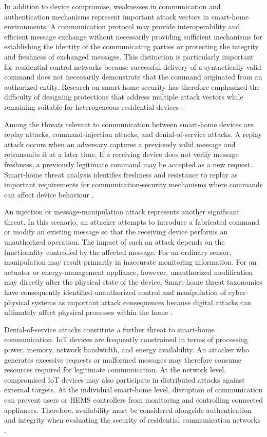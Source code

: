 In addition to device compromise, weaknesses in communication and authentication mechanisms represent important attack vectors in smart-home environments. A communication protocol may provide interoperability and efficient message exchange without necessarily providing sufficient mechanisms for establishing the identity of the communicating parties or protecting the integrity and freshness of exchanged messages. This distinction is particularly important for residential control networks because successful delivery of a syntactically valid command does not necessarily demonstrate that the command originated from an authorized entity. Research on smart-home security has therefore emphasized the difficulty of designing protections that address multiple attack vectors while remaining suitable for heterogeneous residential devices \citep{heartfieldTaxonomyCyberphysicalThreats2018}.

Among the threats relevant to communication between smart-home devices are replay attacks, command-injection attacks, and denial-of-service attacks. A replay attack occurs when an adversary captures a previously valid message and retransmits it at a later time. If a receiving device does not verify message freshness, a previously legitimate command may be accepted as a new request. Smart-home threat analysis identifies freshness and resistance to replay as important requirements for communication-security mechanisms where commands can affect device behaviour \citep{heartfieldTaxonomyCyberphysicalThreats2018}.

An injection or message-manipulation attack represents another significant threat. In this scenario, an attacker attempts to introduce a fabricated command or modify an existing message so that the receiving device performs an unauthorized operation. The impact of such an attack depends on the functionality controlled by the affected message. For an ordinary sensor, manipulation may result primarily in inaccurate monitoring information. For an actuator or energy-management appliance, however, unauthorized modification may directly alter the physical state of the device. Smart-home threat taxonomies have consequently identified unauthorized control and manipulation of cyber-physical systems as important attack consequences because digital attacks can ultimately affect physical processes within the home \citep{heartfieldTaxonomyCyberphysicalThreats2018}.

Denial-of-service attacks constitute a further threat to smart-home communication. IoT devices are frequently constrained in terms of processing power, memory, network bandwidth, and energy availability. An attacker who generates excessive requests or malformed messages may therefore consume resources required for legitimate communication. At the network level, compromised IoT devices may also participate in distributed attacks against external targets. At the individual smart-home level, disruption of communication can prevent users or HEMS controllers from monitoring and controlling connected appliances. Therefore, availability must be considered alongside authentication and integrity when evaluating the security of residential communication networks \citep{antonakakisUnderstandingMiraiBotnet}.

